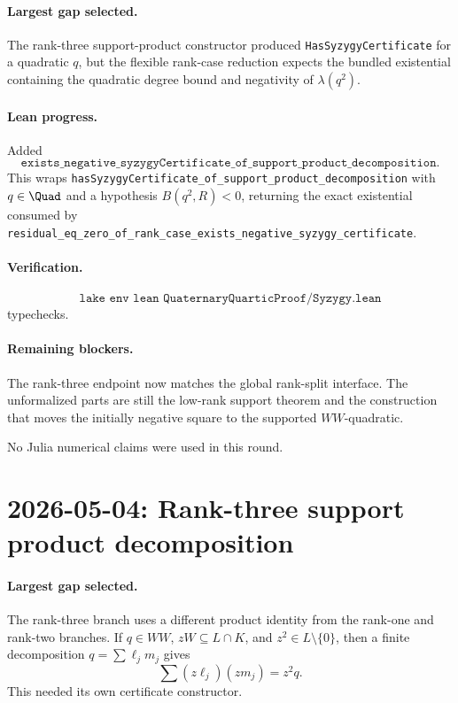\documentclass[11pt]{article}
\begin{document}
\paragraph{Largest gap selected.}
The rank-three support-product constructor produced
\texttt{HasSyzygyCertificate} for a quadratic \(q\), but the flexible
rank-case reduction expects the bundled existential containing the quadratic
degree bound and negativity of \(\lambda(q^2)\).

\paragraph{Lean progress.}
Added
\[
\texttt{exists\_negative\_syzygyCertificate\_of\_support\_product\_decomposition}.
\]
This wraps
\texttt{hasSyzygyCertificate\_of\_support\_product\_decomposition} with
\(q\in\Quad\) and a hypothesis \(B(q^2,R)<0\), returning the exact
existential consumed by
\texttt{residual\_eq\_zero\_of\_rank\_case\_exists\_negative\_syzygy\_certificate}.

\paragraph{Verification.}
\[
\texttt{lake env lean QuaternaryQuarticProof/Syzygy.lean}
\]
typechecks.

\paragraph{Remaining blockers.}
The rank-three endpoint now matches the global rank-split interface.  The
unformalized parts are still the low-rank support theorem and the construction
that moves the initially negative square to the supported \(WW\)-quadratic.

No Julia numerical claims were used in this round.

\section*{2026-05-04: Rank-three support product decomposition}

\paragraph{Largest gap selected.}
The rank-three branch uses a different product identity from the rank-one and
rank-two branches.  If \(q\in WW\), \(zW\subseteq L\cap K\), and
\(z^2\in L\setminus\{0\}\), then a finite decomposition
\(q=\sum \ell_jm_j\) gives
\[
\sum (z\ell_j)(zm_j)=z^2 q.
\]
This needed its own certificate constructor.
\end{document}
